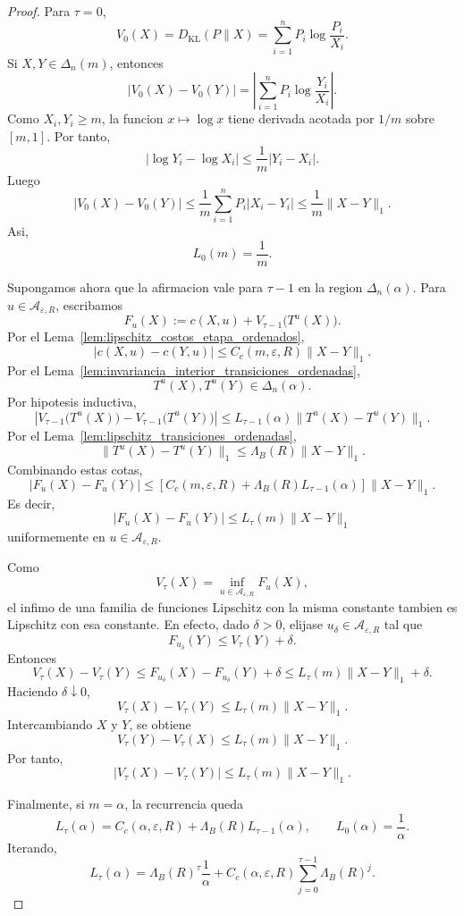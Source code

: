 ﻿\documentclass[12pt]{article}
\begin{document}
\begin{proof}
Para \(\tau=0\),
\[
V_0(X)
=
D_{\mathrm{KL}}(P\|X)
=
\sum_{i=1}^n P_i\log\frac{P_i}{X_i}.
\]
Si \(X,Y\in\Delta_n(m)\), entonces
\[
\left|
V_0(X)-V_0(Y)
\right|
=
\left|
\sum_{i=1}^n P_i\log\frac{Y_i}{X_i}
\right|.
\]
Como \(X_i,Y_i\ge m\), la funcion \(x\mapsto \log x\) tiene derivada acotada por \(1/m\) sobre \([m,1]\). Por tanto,
\[
\left|
\log Y_i-\log X_i
\right|
\le
\frac1m|Y_i-X_i|.
\]
Luego
\[
|V_0(X)-V_0(Y)|
\le
\frac1m\sum_{i=1}^n P_i|X_i-Y_i|
\le
\frac1m\|X-Y\|_1.
\]
Asi,
\[
L_0(m)=\frac1m.
\]

Supongamos ahora que la afirmacion vale para \(\tau-1\) en la region \(\Delta_n(\alpha)\). Para \(u\in\mathcal A_{\varepsilon,R}\), escribamos
\[
F_u(X)
:=
c(X,u)+V_{\tau-1}\bigl(T^u(X)\bigr).
\]
Por el Lema~\ref{lem:lipschitz_costos_etapa_ordenados},
\[
|c(X,u)-c(Y,u)|
\le
C_c(m,\varepsilon,R)\|X-Y\|_1.
\]
Por el Lema~\ref{lem:invariancia_interior_transiciones_ordenadas},
\[
T^u(X),T^u(Y)\in\Delta_n(\alpha).
\]
Por hipotesis inductiva,
\[
\left|
V_{\tau-1}\bigl(T^u(X)\bigr)
-
V_{\tau-1}\bigl(T^u(Y)\bigr)
\right|
\le
L_{\tau-1}(\alpha)
\|T^u(X)-T^u(Y)\|_1.
\]
Por el Lema~\ref{lem:lipschitz_transiciones_ordenadas},
\[
\|T^u(X)-T^u(Y)\|_1
\le
\Lambda_B(R)\|X-Y\|_1.
\]
Combinando estas cotas,
\[
|F_u(X)-F_u(Y)|
\le
\left[
C_c(m,\varepsilon,R)
+
\Lambda_B(R)L_{\tau-1}(\alpha)
\right]
\|X-Y\|_1.
\]
Es decir,
\[
|F_u(X)-F_u(Y)|
\le
L_\tau(m)\|X-Y\|_1
\]
uniformemente en \(u\in\mathcal A_{\varepsilon,R}\).

Como
\[
V_\tau(X)=\inf_{u\in\mathcal A_{\varepsilon,R}}F_u(X),
\]
el infimo de una familia de funciones Lipschitz con la misma constante tambien es Lipschitz con esa constante. En efecto, dado \(\delta>0\), elijase \(u_\delta\in\mathcal A_{\varepsilon,R}\) tal que
\[
F_{u_\delta}(Y)
\le
V_\tau(Y)+\delta.
\]
Entonces
\[
V_\tau(X)-V_\tau(Y)
\le
F_{u_\delta}(X)-F_{u_\delta}(Y)+\delta
\le
L_\tau(m)\|X-Y\|_1+\delta.
\]
Haciendo \(\delta\downarrow0\),
\[
V_\tau(X)-V_\tau(Y)
\le
L_\tau(m)\|X-Y\|_1.
\]
Intercambiando \(X\) y \(Y\), se obtiene
\[
V_\tau(Y)-V_\tau(X)
\le
L_\tau(m)\|X-Y\|_1.
\]
Por tanto,
\[
|V_\tau(X)-V_\tau(Y)|
\le
L_\tau(m)\|X-Y\|_1.
\]

Finalmente, si \(m=\alpha\), la recurrencia queda
\[
L_\tau(\alpha)
=
C_c(\alpha,\varepsilon,R)
+
\Lambda_B(R)L_{\tau-1}(\alpha),
\qquad
L_0(\alpha)=\frac1\alpha.
\]
Iterando,
\[
L_\tau(\alpha)
=
\Lambda_B(R)^\tau\frac1\alpha
+
C_c(\alpha,\varepsilon,R)
\sum_{j=0}^{\tau-1}\Lambda_B(R)^j.
\]
\end{proof}
\end{document}
